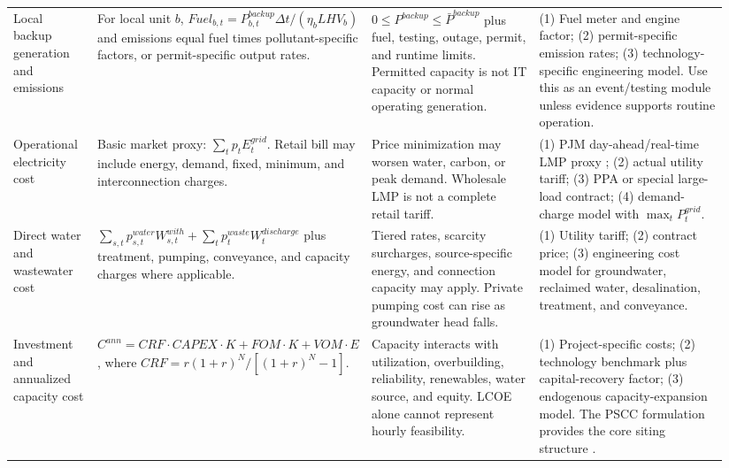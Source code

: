 \documentclass[10pt]{article}
\begin{document}
\begin{landscape}
\begin{longtable}{@{}P{0.12\linewidth}P{0.27\linewidth}P{0.25\linewidth}P{0.30\linewidth}@{}}
Local backup generation and emissions & For local unit $b$, $Fuel_{b,t}=P^{backup}_{b,t}\Delta t/(\eta_bLHV_b)$ and emissions equal fuel times pollutant-specific factors, or permit-specific output rates. & $0\le P^{backup}\le\bar P^{backup}$ plus fuel, testing, outage, permit, and runtime limits. Permitted capacity is not IT capacity or normal operating generation. & (1) Fuel meter and engine factor; (2) permit-specific emission rates; (3) technology-specific engineering model. Use this as an event/testing module unless evidence supports routine operation. \\

Operational electricity cost & Basic market proxy: $\sum_t p_tE^{grid}_t$. Retail bill may include energy, demand, fixed, minimum, and interconnection charges. & Price minimization may worsen water, carbon, or peak demand. Wholesale LMP is not a complete retail tariff. & (1) PJM day-ahead/real-time LMP proxy \cite{pjm}; (2) actual utility tariff; (3) PPA or special large-load contract; (4) demand-charge model with $\max_tP^{grid}_t$. \\

Direct water and wastewater cost & $\sum_{s,t}p^{water}_{s,t}W^{with}_{s,t}+\sum_t p^{waste}_tW^{discharge}_t$ plus treatment, pumping, conveyance, and capacity charges where applicable. & Tiered rates, scarcity surcharges, source-specific energy, and connection capacity may apply. Private pumping cost can rise as groundwater head falls. & (1) Utility tariff; (2) contract price; (3) engineering cost model for groundwater, reclaimed water, desalination, treatment, and conveyance. \\

Investment and annualized capacity cost & $C^{ann}=CRF\cdot CAPEX\cdot K+FOM\cdot K+VOM\cdot E$, where $CRF=r(1+r)^N/[(1+r)^N-1]$. & Capacity interacts with utilization, overbuilding, reliability, renewables, water source, and equity. LCOE alone cannot represent hourly feasibility. & (1) Project-specific costs; (2) technology benchmark plus capital-recovery factor; (3) endogenous capacity-expansion model. The PSCC formulation provides the core siting structure \cite{chen2026pscc}. \\
\end{longtable}


\end{landscape}
\end{document}
